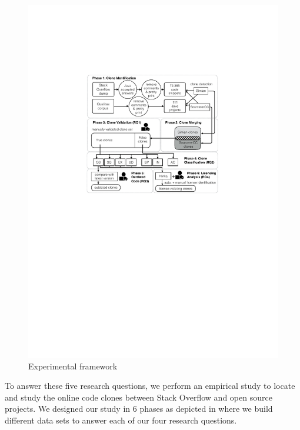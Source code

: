 \documentclass[10pt,journal,compsoc]{IEEEtran}
\begin{document}
\begin{figure}
	\centering
	\includegraphics[width=\linewidth]{exp_framework_new}
	\caption{Experimental framework}
	\label{fig:exp_framework}
\end{figure}

To answer these five research questions, we perform an empirical study to
locate and study the online code clones between Stack Overflow and open source
projects. 
%
%
We designed our study in 6 phases as depicted in  where
we build different data sets to answer each of our four research
questions. 
\end{document}
